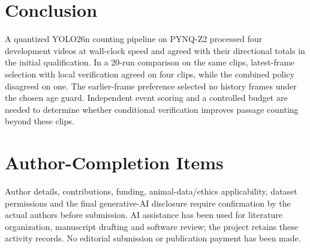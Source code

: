 \documentclass[journal]{IEEEtran}
\begin{document}
\section{Conclusion}
A quantized YOLO26n counting pipeline on PYNQ-Z2 processed four development videos at wall-clock speed and agreed with their directional totals in the initial qualification. In a 20-run comparison on the same clips, latest-frame selection with local verification agreed on four clips, while the combined policy disagreed on one. The earlier-frame preference selected no history frames under the chosen age guard. Independent event scoring and a controlled budget are needed to determine whether conditional verification improves passage counting beyond these clips.

\section*{Author-Completion Items}
Author details, contributions, funding, animal-data/ethics applicability, dataset permissions and the final generative-AI disclosure require confirmation by the actual authors before submission. AI assistance has been used for literature organization, manuscript drafting and software review; the project retains these activity records. No editorial submission or publication payment has been made.



\end{document}
